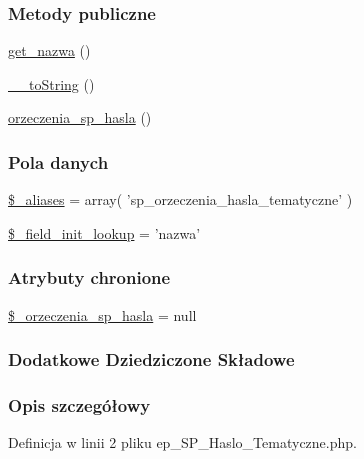 \subsubsection*{Metody publiczne}
\begin{DoxyCompactItemize}
\item 
\hyperlink{classep___s_p___haslo___tematyczne_ac0818f0049d7b84f08f77128f54cee36}{get\-\_\-nazwa} ()
\item 
\hyperlink{classep___s_p___haslo___tematyczne_a7516ca30af0db3cdbf9a7739b48ce91d}{\-\_\-\-\_\-to\-String} ()
\item 
\hyperlink{classep___s_p___haslo___tematyczne_a84ad34834afdafdee94d64ec8fe9ab94}{orzeczenia\-\_\-sp\-\_\-hasla} ()
\end{DoxyCompactItemize}
\subsubsection*{Pola danych}
\begin{DoxyCompactItemize}
\item 
\hyperlink{classep___s_p___haslo___tematyczne_ab4e31d75f0bc5d512456911e5d01366b}{\$\-\_\-aliases} = array( 'sp\-\_\-orzeczenia\-\_\-hasla\-\_\-tematyczne' )
\item 
\hyperlink{classep___s_p___haslo___tematyczne_a4a4d54ae35428077a7c61ec8a5139af3}{\$\-\_\-field\-\_\-init\-\_\-lookup} = 'nazwa'
\end{DoxyCompactItemize}
\subsubsection*{Atrybuty chronione}
\begin{DoxyCompactItemize}
\item 
\hyperlink{classep___s_p___haslo___tematyczne_a58fe6d4f32861f2c8beb57d8226533d4}{\$\-\_\-orzeczenia\-\_\-sp\-\_\-hasla} = null
\end{DoxyCompactItemize}
\subsubsection*{Dodatkowe Dziedziczone Składowe}


\subsubsection{Opis szczegółowy}


Definicja w linii 2 pliku ep\-\_\-\-S\-P\-\_\-\-Haslo\-\_\-\-Tematyczne.\-php.



